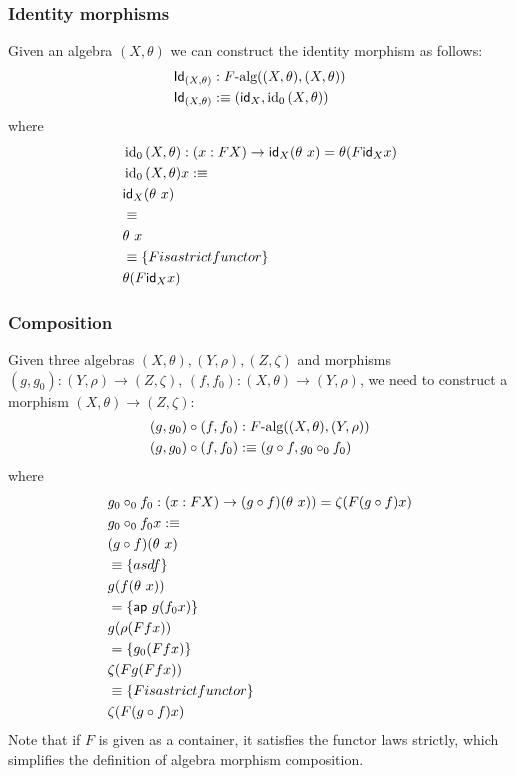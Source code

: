 \documentclass[a4paper,10pt]{article}
\begin{document}
\subsubsection{Identity morphisms}

Given an algebra $(X,\theta)$ we can construct the identity morphism as follows:
%
\begin{align*}
  &\mathsf{Id}_{(X,\theta)} : F\mbox{-alg}((X,\theta),(X,\theta)) \\
  &\mathsf{Id}_{(X,\theta)} :\equiv (\mathsf{id}_{X} , \operatorname*{id_0}{(X,\theta)})
\end{align*}
%
where
%
\begin{align*}
  &\operatorname*{id_0}{(X,\theta)} : (x : FX) \to \mathsf{id}_{X} (\theta\ x) = \theta (F \mathsf{id}_{X} x) \\
  &\operatorname*{id_0}{(X,\theta)} x :\equiv \\
  &\mathsf{id}_{X} (\theta\ x) \\
  &\equiv \\
  &\theta\ x \\
  &\equiv \{ F is a strict functor \} \\
  &\theta (F \mathsf{id}_{X} x)
\end{align*}
%
\subsubsection{Composition}

Given three algebras $(X,\theta), (Y,\rho), (Z,\zeta)$ and morphisms
$(g,g_0) : (Y,\rho) \to (Z,\zeta)$,
$(f,f_0) : (X,\theta) \to (Y,\rho)$, we need to construct a morphism
$(X,\theta) \to (Z,\zeta)$:
%
\begin{align*}
  &(g,g_0) \circ (f,f_0) : F\mbox{-alg}((X,\theta),(Y,\rho)) \\
  &(g,g_0) \circ (f,f_0) :\equiv (g \circ f , g_0 \circ_0 f_0)
\end{align*}
%
where
%
\begin{align*}
  &g_0 \circ_0 f_0 : (x : FX) \to (g \circ f) (\theta\ x)) = \zeta (F (g \circ f) x) \\
  &g_0 \circ_0 f_0 x :\equiv \\
  &(g \circ f) (\theta\ x) \\
  &\equiv \{ asdf \} \\
  &g (f (\theta\ x)) \\
  &= \{ \mathsf{ap}\ g (f_0 x) \} \\
  &g (\rho (F f x)) \\
  &= \{ g_0 (F f x) \} \\
  &\zeta (F g (F f x)) \\
  &\equiv \{ F is a strict functor \} \\
  &\zeta (F (g \circ f) x)
\end{align*}
%
Note that if $F$ is given as a container, it satisfies the functor
laws strictly, which simplifies the definition of algebra morphism
composition.
\end{document}

